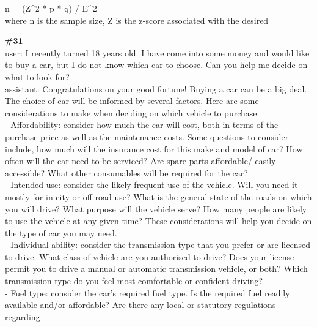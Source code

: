 \documentclass[10pt]{article}
\begin{document}
\begin{Form}
\begin{tcolorbox}[colback=convbg,colframe=itemframe,boxrule=0.8pt,arc=2pt,breakable,left=6pt,right=6pt,top=5pt,bottom=5pt]
{n = (Z\textasciicircum{}2 * p * q) / E\textasciicircum{}2 \\[2pt]
where n is the sample size, Z is the z-score associated with the desired}
\end{tcolorbox}
\vspace{-1pt}
\CheckBox[name=q30c,width=1.6ex,height=1.6ex,bordercolor={0.45 0.45 0.45}]{~\textcolor{cbox}{COMPACT}}\quad
\CheckBox[name=q30d,width=1.6ex,height=1.6ex,bordercolor={0.45 0.45 0.45}]{~\textcolor{dbox}{DIFFUSE}}\quad
\CheckBox[name=q30n,width=1.6ex,height=1.6ex,bordercolor={0.45 0.45 0.45}]{~\textcolor{nbox}{NONE}}
\vspace{8pt}
\begin{tcolorbox}[colback=convbg,colframe=itemframe,boxrule=0.8pt,arc=2pt,breakable,left=6pt,right=6pt,top=5pt,bottom=5pt]
{\footnotesize\textbf{\#31}}\\[3pt]
{\footnotesize user: I recently turned 18 years old. I have come into some money and would like to buy a car, but I do not know which car to choose. Can you help me decide on what to look for? \\[2pt]
assistant: Congratulations on your good fortune! Buying a car can be a big deal. The choice of car will be informed by several factors. Here are some considerations to make when deciding on which vehicle to purchase: \\[2pt]
- Affordability: consider how much the car will cost, both in terms of the purchase price as well as the maintenance costs. Some questions to consider include, how much will the insurance cost for this make and model of car? How often will the car need to be serviced? Are spare parts affordable/ easily accessible? What other consumables will be required for the car? \\[2pt]
- Intended use: consider the likely frequent use of the vehicle. Will you need it mostly for in-city or off-road use? What is the general state of the roads on which you will drive? What purpose will the vehicle serve? How many people are likely to use the vehicle at any given time? These considerations will help you decide on the type of car you may need. \\[2pt]
- Individual ability: consider the transmission type that you prefer or are licensed to drive. What class of vehicle are you authorised to drive? Does your license permit you to drive a manual or automatic transmission vehicle, or both? Which transmission type do you feel most comfortable or confident driving? \\[2pt]
- Fuel type: consider the car's required fuel type. Is the required fuel readily available and/or affordable? Are there any local or statutory regulations regarding}

\end{tcolorbox}
\end{Form}
\end{document}
